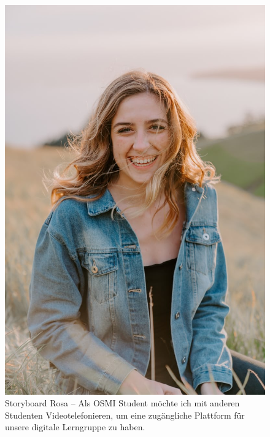 \documentclass{article}
\begin{document}
\begin{figure}[h]
	\includegraphics[angle=90,width=\textwidth]{rosa}
	\centering
	\caption{Storyboard Rosa – Als OSMI Student möchte ich mit anderen Studenten Videotelefonieren, um eine zugängliche Plattform für unsere digitale Lerngruppe zu haben.}
\end{figure}


\newpage
\end{document}
